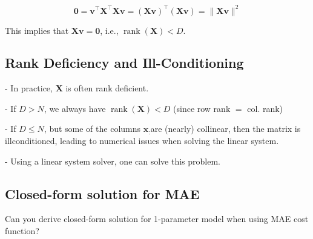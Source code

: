 $$
\mathbf{0}=\mathbf{v}^{\top} \mathbf{X}^{\top} \mathbf{X} \mathbf{v}=(\mathbf{X} \mathbf{v})^{\top}(\mathbf{X} \mathbf{v})=\|\mathbf{X} \mathbf{v}\|^{2}
$$

This implies that $\mathbf{X v}=\mathbf{0}$, i.e., $\operatorname{rank}(\mathbf{X})<D$.

\subsection*{Rank Deficiency and Ill-Conditioning}
- In practice, $\mathbf{X}$ is often rank deficient.

- If $D>N$, we always have $\operatorname{rank}(\mathbf{X})<D$ (since row rank $=$ col. rank)

- If $D \leq N$, but some of the columns $\mathbf{x}_{:}$are (nearly) collinear, then the matrix is illconditioned, leading to numerical issues when solving the linear system.

- Using a linear system solver, one can solve this problem.

\subsection*{Closed-form solution for MAE}
Can you derive closed-form solution for 1-parameter model when using MAE cost function?

